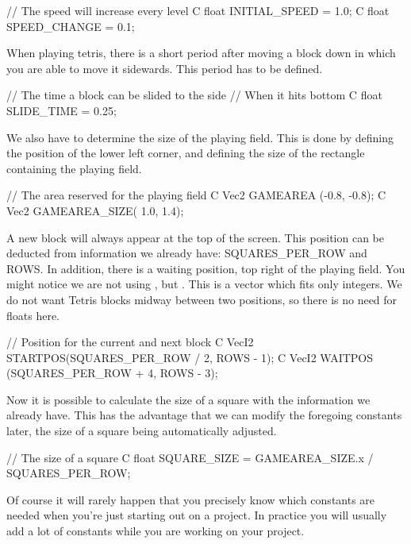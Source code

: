 \begin{code}
// The speed will increase every level
C float INITIAL_SPEED = 1.0;
C float SPEED_CHANGE  = 0.1;
\end{code}

When playing tetris, there is a short period after moving a block down in which you are able to move it sidewards. This period has to be defined.

\begin{code}
// The time a block can be slided to the side
// When it hits bottom
C float SLIDE_TIME = 0.25;
\end{code}

We also have to determine the size of the playing field. This is done by defining the position of the lower left corner, and defining the size of the rectangle containing the playing field.

\begin{code}
// The area reserved for the playing field 
C Vec2 GAMEAREA     (-0.8, -0.8);
C Vec2 GAMEAREA_SIZE( 1.0,  1.4);
\end{code}

A new block will always appear at the top of the screen. This position can be deducted from information we already have:  SQUARES\_PER\_ROW and ROWS. In addition, there is a waiting position, top right of the playing field. You might notice we are not using , but . This is a vector which fits only integers. We do not want Tetris blocks midway between two positions, so there is no need for floats here.

\begin{code}
// Position for the current and next block
C VecI2 STARTPOS(SQUARES_PER_ROW / 2, ROWS - 1);
C VecI2 WAITPOS (SQUARES_PER_ROW + 4, ROWS - 3);
\end{code}

Now it is possible to calculate the size of a square with the information we already have. This has the advantage that we can modify the foregoing constants later, the size of a square being automatically adjusted.

\begin{code}
// The size of a square
C float SQUARE_SIZE = GAMEAREA_SIZE.x / SQUARES_PER_ROW;
\end{code}

\begin{note}
Of course it will rarely happen that you precisely know which constants are needed when you're just starting out on a project. In practice you will usually add a lot of constants while you are working on your project.
\end{note}

